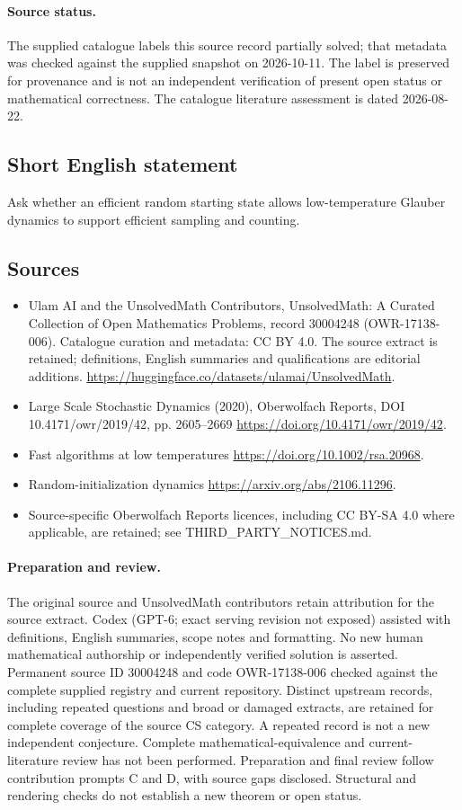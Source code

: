 \documentclass[11pt]{article}
\begin{document}
\paragraph{Source status.}
The supplied catalogue labels this source record partially solved; that metadata was checked against the supplied snapshot on 2026-10-11. The label is preserved for provenance and is not an independent verification of present open status or mathematical correctness. The catalogue literature assessment is dated 2026-08-22.
\subsection{Short English statement}
Ask whether an efficient random starting state allows low-temperature Glauber dynamics to support efficient sampling and counting.
\subsection{Sources}
\begin{itemize}
\item[\hypertarget{source:30004248:1}{S1}] Ulam AI and the UnsolvedMath Contributors, UnsolvedMath: A Curated Collection of Open Mathematics Problems, record 30004248 (OWR-17138-006). Catalogue curation and metadata: CC BY 4.0. The source extract is retained; definitions, English summaries and qualifications are editorial additions.
\url{https://huggingface.co/datasets/ulamai/UnsolvedMath}.
\item[\hypertarget{source:30004248:2}{S2}] Large Scale Stochastic Dynamics (2020), Oberwolfach Reports, DOI 10.4171/owr/2019/42, pp. 2605--2669
\url{https://doi.org/10.4171/owr/2019/42}.
\item[\hypertarget{source:30004248:3}{S3}] Fast algorithms at low temperatures
\url{https://doi.org/10.1002/rsa.20968}.
\item[\hypertarget{source:30004248:4}{S4}] Random-initialization dynamics
\url{https://arxiv.org/abs/2106.11296}.
\item Source-specific Oberwolfach Reports licences, including CC BY-SA 4.0 where applicable, are retained; see THIRD\_PARTY\_NOTICES.md.
\end{itemize}
\paragraph{Preparation and review.}
The original source and UnsolvedMath contributors retain attribution for the source extract. Codex (GPT-6; exact serving revision not exposed) assisted with definitions, English summaries, scope notes and formatting. No new human mathematical authorship or independently verified solution is asserted. Permanent source ID 30004248 and code OWR-17138-006 checked against the complete supplied registry and current repository. Distinct upstream records, including repeated questions and broad or damaged extracts, are retained for complete coverage of the source CS category. A repeated record is not a new independent conjecture. Complete mathematical-equivalence and current-literature review has not been performed. Preparation and final review follow contribution prompts C and D, with source gaps disclosed. Structural and rendering checks do not establish a new theorem or open status.
\label{end:30004248}
\end{document}
